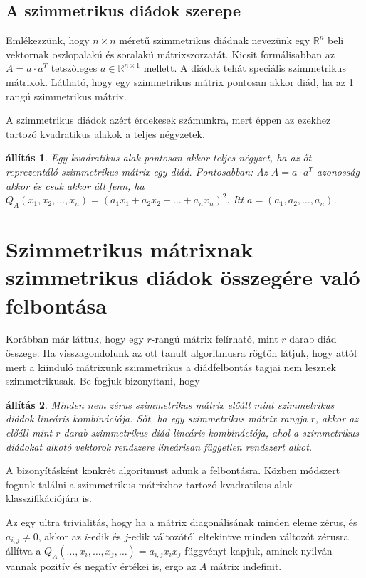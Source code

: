 \documentclass[a4paper, showtrims]{memoir}
\theoremstyle{plain}
\newtheorem{proposition}{állítás}[chapter]
\theoremstyle{remark}
\theoremstyle{definition}
\begin{document}
\subsection{A szimmetrikus diádok szerepe}
Emlékezzünk, hogy $n\times n$ méretű szimmetrikus diádnak nevezünk egy $\mathbb{R}^n$ beli vektornak
oszlopalakú és soralakú mátrixszorzatát. 
Kicsit formálisabban az $A=a\cdot a^T$ tetszőleges $a\in\mathbb{R}^{n\times 1}$ mellett.
A diádok tehát speciális szimmetrikus mátrixok.
Látható, hogy egy szimmetrikus mátrix pontosan akkor diád, 
ha az 1 rangú szimmetrikus mátrix.

A szimmetrikus diádok azért érdekesek számunkra, 
mert éppen az ezekhez tartozó kvadratikus alakok a teljes négyzetek.
\begin{proposition}
   Egy kvadratikus alak pontosan akkor teljes négyzet, ha az őt reprezentáló szimmetrikus mátrix egy diád.
   Pontosabban:
   Az $A=a\cdot a^T$ azonosság akkor és csak akkor áll fenn, ha
      \(
         Q_A\left( x_1,x_2,\ldots,x_n \right)=
         \left( a_1x_1+a_2x_2+\ldots+a_nx_n \right)^2.
      \)
   Itt $a=\left( a_1,a_2,\ldots,a_n \right)$.
\end{proposition}

\section{Szimmetrikus mátrixnak szimmetrikus diádok összegére való felbontása}
Korábban már láttuk, hogy egy $r$-rangú mátrix felírható, 
mint $r$ darab diád összege.
Ha visszagondolunk az ott tanult algoritmusra rögtön látjuk, 
hogy attól mert a kiinduló mátrixunk szimmetrikus a diádfelbontás tagjai nem lesznek szimmetrikusak.
Be fogjuk bizonyítani, hogy 
\begin{proposition}
    Minden nem zérus szimmetrikus mátrix előáll mint szimmetrikus diádok lineáris kombinációja.
    Sőt, ha egy szimmetrikus mátrix rangja $r$, 
    akkor az előáll mint $r$ darab szimmetrikus diád lineáris kombinációja, 
    ahol a szimmetrikus diádokat alkotó vektorok rendszere lineárisan független rendszert alkot.
\end{proposition}
A bizonyításként konkrét algoritmust adunk a felbontásra.
Közben módszert fogunk találni a szimmetrikus mátrixhoz tartozó kvadratikus alak klasszifikációjára is.

Az egy ultra trivialitás, hogy ha a mátrix diagonálisának minden eleme zérus, 
és $a_{i,j}\neq 0$, akkor az $i$-edik és $j$-edik változótól eltekintve minden változót zérusra állítva
a $Q_A(\dots,x_i,\dots,x_j,\dots)=a_{i,j}x_ix_j$ függvényt kapjuk,
aminek nyilván vannak pozitív és negatív értékei is,
ergo az $A$ mátrix indefinit.
\end{document}

